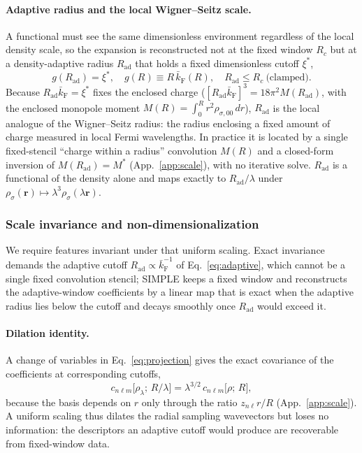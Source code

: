 \documentclass[aps,prb,reprint,superscriptaddress,nofootinbib]{revtex4-2}
\newcommand{\rr}{\mathbf{r}}
\newcommand{\kF}{k_{\mathrm{F}}}
\newcommand{\Rad}{R_{\mathrm{ad}}}
\newcommand{\Rc}{R_{c}}
\begin{document}
\paragraph*{Adaptive radius and the local Wigner--Seitz scale.}
A functional must see the same dimensionless environment regardless of the local
density scale, so the expansion is reconstructed not at the fixed window $\Rc$ but at
a density-adaptive radius $\Rad$ that holds a fixed dimensionless cutoff $\xi^*$,
\begin{equation}
\label{eq:adaptive}
g(\Rad)=\xi^*,\quad g(R)\equiv R\,\bar\kF(R),\quad \Rad\le\Rc\ \text{(clamped)} .
\end{equation}
Because $\Rad\bar\kF=\xi^*$ fixes the enclosed charge
($[\Rad\bar\kF]^3=18\pi^2 M(\Rad)$, with the enclosed monopole moment
$M(R)=\int_0^R r^2\rho_{\sigma,00}\,dr$), $\Rad$ is the local analogue of the
Wigner--Seitz radius: the radius enclosing a fixed amount of charge measured in local
Fermi wavelengths. In practice it is located by a single fixed-stencil ``charge
within a radius'' convolution $M(R)$ and a closed-form inversion of $M(\Rad)=M^*$
(App.~\ref{app:scale}), with no iterative solve. $\Rad$ is a functional of the
density alone and maps exactly to $\Rad/\lambda$ under
$\rho_\sigma(\rr)\mapsto\lambda^3\rho_\sigma(\lambda\rr)$.

\subsubsection{Scale invariance and non-dimensionalization}
\label{sec:scale}

We require features invariant under that uniform scaling. Exact invariance demands
the adaptive cutoff $\Rad\propto\bar\kF^{-1}$ of Eq.~\eqref{eq:adaptive}, which cannot
be a single fixed convolution stencil; SIMPLE keeps a fixed window and reconstructs
the adaptive-window coefficients by a linear map that is exact when the adaptive
radius lies below the cutoff and decays smoothly once $\Rad$ would exceed it.

\paragraph*{Dilation identity.}
A change of variables in Eq.~\eqref{eq:projection} gives the exact covariance of
the coefficients at corresponding cutoffs,
\begin{equation}
\label{eq:dilation}
c_{n\ell m}\bigl[\rho_\lambda;\,R/\lambda\bigr]=\lambda^{3/2}\,
c_{n\ell m}\bigl[\rho;\,R\bigr],
\end{equation}
because the basis depends on $r$ only through the ratio $z_{n\ell}r/R$
(App.~\ref{app:scale}). A uniform scaling thus dilates the radial sampling
wavevectors but loses no information: the descriptors an adaptive cutoff would
produce are recoverable from fixed-window data.
\end{document}
